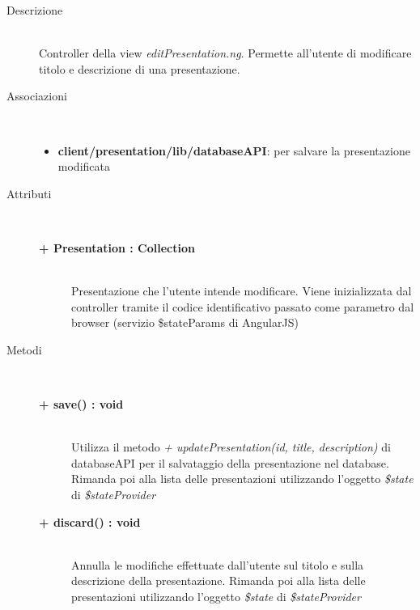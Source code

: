 \begin{description}
\item[Descrizione] \hfill \\
	Controller della view \textit{editPresentation.ng}. Permette all'utente di modificare titolo e descrizione di una presentazione.
	

\item[Associazioni] \hfill \\
	\begin{itemize}
		\item \textbf{client/presentation/lib/databaseAPI}: per salvare la presentazione modificata
	\end{itemize}

	
\item[Attributi] \hfill \\
	\begin{description}
		\item[\textbf{+ Presentation : Collection			}] \hfill \\
			Presentazione che l'utente intende modificare. Viene inizializzata dal controller tramite il codice identificativo passato come parametro dal browser (servizio \$stateParams di AngularJS)
	\end{description}
	
	
\item[Metodi] \hfill \\

	\begin{description}
		\item[\textbf{\color{blue}+ save() : void			}] \hfill \\
			Utilizza il metodo \textit{+ updatePresentation(id, title, description)} di databaseAPI per il salvataggio della presentazione nel database. Rimanda poi alla lista delle presentazioni utilizzando l'oggetto \textit{\$state} di \textit{\$stateProvider}
	\end{description}
	
	\begin{description}
		\item[\textbf{\color{blue}+ discard() : void			}] \hfill \\
			Annulla le modifiche effettuate dall'utente sul titolo e sulla descrizione della presentazione. Rimanda poi alla lista delle presentazioni utilizzando l'oggetto \textit{\$state} di \textit{\$stateProvider}
	\end{description}
	
	
	
\end{description}

